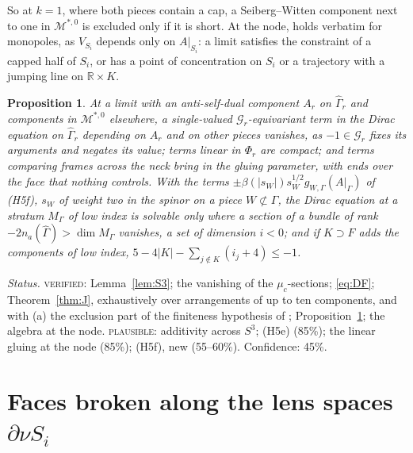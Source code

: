 \documentclass[10pt]{amsart}
\numberwithin{equation}{section}
\theoremstyle{compact}
\newtheorem{proposition}[theorem]{Proposition}
\newcommand{\cM}{\mathcal M}
\newcommand{\cG}{\mathcal G}
\newcommand{\Ms}{\cM^{*,0}}
\newcommand{\step}[1]{\par\noindent\textit{#1}\enspace}
\newcommand{\ver}{\textsc{verified}}
\newcommand{\pla}{\textsc{plausible}}
\begin{document}
So at $k=1$, where both pieces contain a cap, a Seiberg--Witten component next
to one in $\Ms$ is excluded only if it is short. At the node,
\cite[Lemma~3.2]{FS} holds verbatim for monopoles, as $V_{S_i}$ depends only on
$A|_{S_i}$: a limit satisfies the constraint of a capped half of $S_i$, or has a
point of concentration on $S_i$ or a trajectory with a jumping line on $\mathbb
R\times K$.

\begin{proposition}\label{prop:twovalued}
At a limit with an anti-self-dual component $A_r$ on $\hat\Gamma_r$ and
components in $\Ms$ elsewhere, a single-valued $\cG_r$-equivariant term in the
Dirac equation on $\hat\Gamma_r$ depending on $A_r$ and on other pieces
vanishes, as $-1\in\cG_r$ fixes its arguments and negates its value; terms
linear in $\Phi_r$ are compact; and terms
comparing frames across the neck bring in the gluing parameter, with ends over
the face that nothing controls. With the terms $\pm\beta(|s_W|)s_W^{1/2}
g_{W,\Gamma}(A|_\Gamma)$ of \textup{(H5f)}, $s_W$ of weight two in the spinor on
a piece $W\not\subset\Gamma$, the Dirac equation at a stratum $M_\Gamma$ of low
index is solvable only where a section of a bundle of rank
$-2n_a(\hat\Gamma)>\dim M_\Gamma$ vanishes, a set of dimension $i<0$; and if
$K\supset F$ adds the components of low index, $5-4|K|-\sum_{j\notin
K}(i_j+4)\le-1$.
\end{proposition}

\step{Status.} \ver: Lemma~\ref{lem:S3}; the vanishing of the
$\mu_c$-sections; \eqref{eq:DF}; Theorem~\ref{thm:J}, exhaustively over
arrangements of up to ten components, and with (a) the exclusion part of the
finiteness hypothesis of \cite[Thm.~4.1]{FS}; Proposition~\ref{prop:twovalued};
the algebra at the node. \pla: additivity across $S^3$; (H5e) (85\%); the
linear gluing at the node (85\%); (H5f), new (55--60\%). Confidence: 45\%.

\section{Faces broken along the lens spaces $\partial\nu S_i$}
\end{document}
